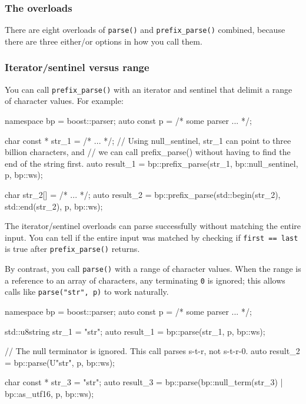 \subsubsection{The overloads}

There are eight overloads of \texttt{parse()} and \texttt{prefix\_parse()} combined, because there are three either/or options in how you call them.

\subsubsection{Iterator/sentinel versus range}

You can call \texttt{prefix\_parse()} with an iterator and sentinel that delimit a range of character values. For example:

\begin{code}
namespace bp = boost::parser;
auto const p = /* some parser ... */;

char const * str_1 = /* ... */;
// Using null_sentinel, str_1 can point to three billion characters, and
// we can call prefix_parse() without having to find the end of the string first.
auto result_1 = bp::prefix_parse(str_1, bp::null_sentinel, p, bp::ws);

char str_2[] = /* ... */;
auto result_2 = bp::prefix_parse(std::begin(str_2), std::end(str_2), p, bp::ws);
\end{code}

The iterator/sentinel overloads can parse successfully without matching the entire input. You can tell if the entire input was matched by checking if \texttt{first == last} is true after \texttt{prefix\_parse()} returns.

By contrast, you call \texttt{parse()} with a range of character values. When the range is a reference to an array of characters, any terminating \texttt{0} is ignored; this allows calls like \texttt{parse("str", p)} to work naturally.

\begin{code}
namespace bp = boost::parser;
auto const p = /* some parser ... */;

std::u8string str_1 = "str";
auto result_1 = bp::parse(str_1, p, bp::ws);

// The null terminator is ignored.  This call parses s-t-r, not s-t-r-0.
auto result_2 = bp::parse(U"str", p, bp::ws);

char const * str_3 = "str";
auto result_3 = bp::parse(bp::null_term(str_3) | bp::as_utf16, p, bp::ws);
\end{code}

